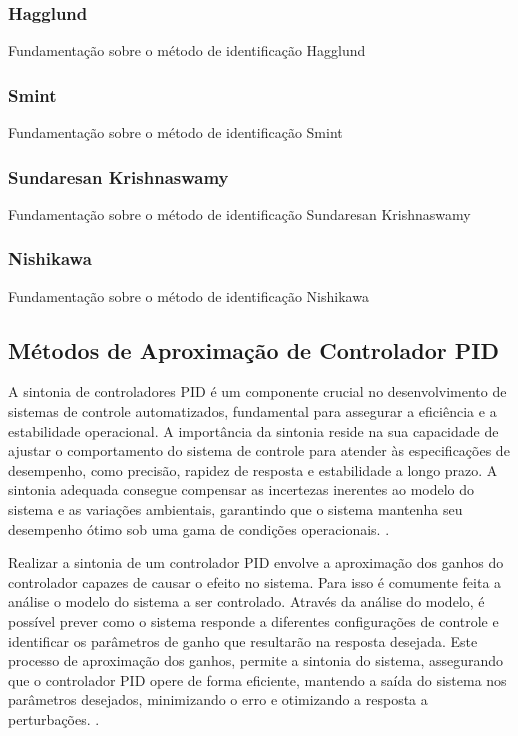 \subsubsection{Hagglund}

Fundamentação sobre o método de identificação Hagglund

\subsubsection{Smint}

Fundamentação sobre o método de identificação Smint

\subsubsection{Sundaresan Krishnaswamy}

Fundamentação sobre o método de identificação Sundaresan Krishnaswamy

\subsubsection{Nishikawa}

Fundamentação sobre o método de identificação Nishikawa

\subsection{Métodos de Aproximação de Controlador PID}

A sintonia de controladores PID é um componente crucial no desenvolvimento de sistemas de controle automatizados,
fundamental para assegurar a eficiência e a estabilidade operacional.
A importância da sintonia reside na sua capacidade de ajustar o comportamento do sistema de controle para atender às
especificações de desempenho, como precisão, rapidez de resposta e estabilidade a longo prazo.
A sintonia adequada consegue compensar as incertezas inerentes ao modelo do sistema e as variações ambientais,
garantindo que o sistema mantenha seu desempenho ótimo sob uma gama de condições operacionais.
\cite{apostpidsint}.

Realizar a sintonia de um controlador PID envolve a aproximação dos ganhos do controlador capazes de causar o efeito no
sistema.
Para isso é comumente feita a análise o modelo do sistema a ser controlado.
Através da análise do modelo, é possível prever como o sistema responde a diferentes configurações de controle e
identificar os parâmetros de ganho que resultarão na resposta desejada.
Este processo de aproximação dos ganhos, permite a sintonia do sistema, assegurando que o controlador PID opere de forma
eficiente, mantendo a saída do sistema nos parâmetros desejados, minimizando o erro e otimizando a resposta a
perturbações. \cite{apostpidsint}.

